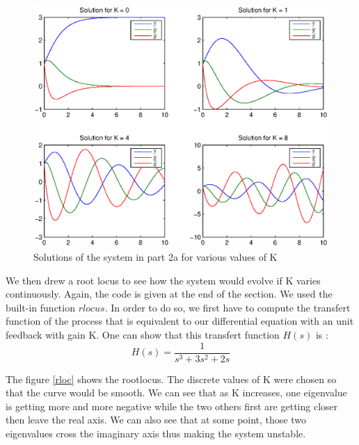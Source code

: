\begin{figure}
\begin{center}
\includegraphics[scale=0.5]{result21.eps}
\caption{Solutions of the system in part 2a for various values of K}
\label{result21}
\end{center}
\end{figure}

We then drew a root locus to see how the system would evolve if K varies continuously. Again, the code is given at the end of the section. We used the built-in function $rlocus$. In order to do so, we first have to compute the transfert function of the process that is equivalent to our differential equation with an unit feedback with gain K. One can show that this transfert function $H(s)$ is :
$$H(s) = \frac{1}{s^3+3s^2+2s}$$

The figure \ref{rloc} shows the rootlocus. The discrete values of K were chosen so that the curve would be smooth. We can see that as K increases, one eigenvalue is getting more and more negative while the two others first are getting closer then leave the real axis. We can also see that at some point, those two eigenvalues cross the imaginary axis thus making the system unstable.


